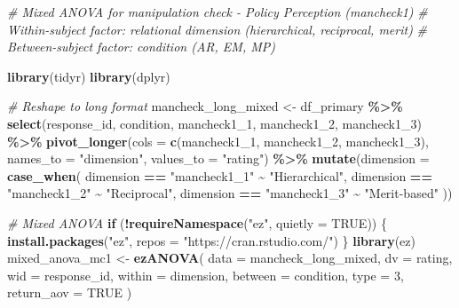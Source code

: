 \documentclass[
]{article}
\newenvironment{Shaded}{\begin{snugshade}}{\end{snugshade}}
\newcommand{\AttributeTok}[1]{\textcolor[rgb]{0.13,0.29,0.53}{#1}}
\newcommand{\CommentTok}[1]{\textcolor[rgb]{0.56,0.35,0.01}{\textit{#1}}}
\newcommand{\ConstantTok}[1]{\textcolor[rgb]{0.56,0.35,0.01}{#1}}
\newcommand{\ControlFlowTok}[1]{\textcolor[rgb]{0.13,0.29,0.53}{\textbf{#1}}}
\newcommand{\DecValTok}[1]{\textcolor[rgb]{0.00,0.00,0.81}{#1}}
\newcommand{\FunctionTok}[1]{\textcolor[rgb]{0.13,0.29,0.53}{\textbf{#1}}}
\newcommand{\NormalTok}[1]{#1}
\newcommand{\OtherTok}[1]{\textcolor[rgb]{0.56,0.35,0.01}{#1}}
\newcommand{\SpecialCharTok}[1]{\textcolor[rgb]{0.81,0.36,0.00}{\textbf{#1}}}
\newcommand{\StringTok}[1]{\textcolor[rgb]{0.31,0.60,0.02}{#1}}
\begin{document}
\begin{Shaded}
\begin{Highlighting}[]
\CommentTok{\# Mixed ANOVA for manipulation check {-} Policy Perception (mancheck1)}
\CommentTok{\# Within{-}subject factor: relational dimension (hierarchical, reciprocal, merit)}
\CommentTok{\# Between{-}subject factor: condition (AR, EM, MP)}

\FunctionTok{library}\NormalTok{(tidyr)}
\FunctionTok{library}\NormalTok{(dplyr)}

\CommentTok{\# Reshape to long format}
\NormalTok{mancheck\_long\_mixed }\OtherTok{\textless{}{-}}\NormalTok{ df\_primary }\SpecialCharTok{\%\textgreater{}\%}
  \FunctionTok{select}\NormalTok{(response\_id, condition, mancheck1\_1, mancheck1\_2, mancheck1\_3) }\SpecialCharTok{\%\textgreater{}\%}
  \FunctionTok{pivot\_longer}\NormalTok{(}\AttributeTok{cols =} \FunctionTok{c}\NormalTok{(mancheck1\_1, mancheck1\_2, mancheck1\_3),}
               \AttributeTok{names\_to =} \StringTok{"dimension"}\NormalTok{,}
               \AttributeTok{values\_to =} \StringTok{"rating"}\NormalTok{) }\SpecialCharTok{\%\textgreater{}\%}
  \FunctionTok{mutate}\NormalTok{(}\AttributeTok{dimension =} \FunctionTok{case\_when}\NormalTok{(}
\NormalTok{    dimension }\SpecialCharTok{==} \StringTok{"mancheck1\_1"} \SpecialCharTok{\textasciitilde{}} \StringTok{"Hierarchical"}\NormalTok{,}
\NormalTok{    dimension }\SpecialCharTok{==} \StringTok{"mancheck1\_2"} \SpecialCharTok{\textasciitilde{}} \StringTok{"Reciprocal"}\NormalTok{,}
\NormalTok{    dimension }\SpecialCharTok{==} \StringTok{"mancheck1\_3"} \SpecialCharTok{\textasciitilde{}} \StringTok{"Merit{-}based"}
\NormalTok{  ))}

\CommentTok{\# Mixed ANOVA}
\ControlFlowTok{if}\NormalTok{ (}\SpecialCharTok{!}\FunctionTok{requireNamespace}\NormalTok{(}\StringTok{"ez"}\NormalTok{, }\AttributeTok{quietly =} \ConstantTok{TRUE}\NormalTok{)) \{}
  \FunctionTok{install.packages}\NormalTok{(}\StringTok{"ez"}\NormalTok{, }\AttributeTok{repos =} \StringTok{"https://cran.rstudio.com/"}\NormalTok{)}
\NormalTok{\}}
\FunctionTok{library}\NormalTok{(ez)}
\NormalTok{mixed\_anova\_mc1 }\OtherTok{\textless{}{-}} \FunctionTok{ezANOVA}\NormalTok{(}
  \AttributeTok{data =}\NormalTok{ mancheck\_long\_mixed,}
  \AttributeTok{dv =}\NormalTok{ rating,}
  \AttributeTok{wid =}\NormalTok{ response\_id,}
  \AttributeTok{within =}\NormalTok{ dimension,}
  \AttributeTok{between =}\NormalTok{ condition,}
  \AttributeTok{type =} \DecValTok{3}\NormalTok{,}
  \AttributeTok{return\_aov =} \ConstantTok{TRUE}
\NormalTok{)}
\end{Highlighting}
\end{Shaded}
\end{document}
